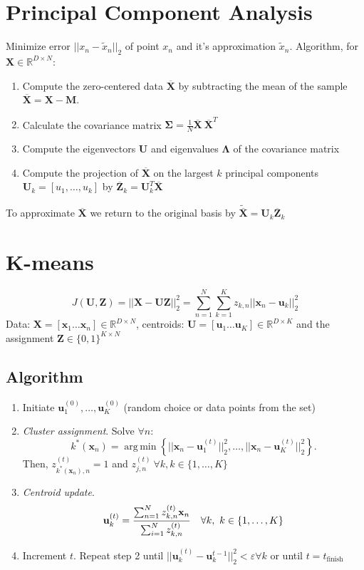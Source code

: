 \documentclass[a4paper,11pt,landscape]{article}
\renewcommand{\epsilon}{\varepsilon}
\newcommand{\argmin}{\operatorname*{arg\,min}}
\newcommand{\R}{\mathbb{R}}
\newcommand{\sectionline}{\noindent\makebox[\linewidth]{\rule{\columnwidth}{0.1pt}}}
\newcommand{\msection}[1]{\vspace{-1mm}\sectionline\vspace{-1mm}\section{#1}\vspace{-1mm}}
\begin{document}
\begin{multicols}{3}
\msection{Principal Component Analysis}
Minimize error $||x_n - \tilde x_n||_2$ of point $x_n$ and it's approximation $\tilde x_n$.
Algorithm, for $\mathbf X\in \R^{D\times N}$:
\begin{enumerate}
 \item Compute the zero-centered data $\overline{\mathbf X}$ by subtracting the mean of the sample $\overline{\mathbf X} = \mathbf X - \mathbf M$.
 \item Calculate the covariance matrix $\mathbf \Sigma = \frac{1}{N}\overline{\mathbf X} \ \overline{\mathbf X}^T$
 \item Compute the eigenvectors $\mathbf U$ and eigenvalues $\mathbf \Lambda$ of the covariance matrix
 \item Compute the projection of $\overline{\mathbf X}$ on the largest $k$ principal components $\mathbf U_k = [u_1, \ldots, u_k]$ by $\overline{\mathbf Z}_k = \mathbf U_k^T \overline{\mathbf X}$
\end{enumerate}
To approximate $\overline{\mathbf X}$ we return to the original basis by $\tilde{\overline{\mathbf X}} = \mathbf U_k \overline{\mathbf Z}_k$

\msection{$\mathbf K$-means}
\[
    J(\mathbf U, \mathbf Z) = ||\mathbf X - \mathbf{UZ}||_2^2 = \sum_{n=1}^N \sum_{k=1}^K z_{k,n} ||\mathbf x_n - \mathbf u_k ||_2^2
\]
Data: $\mathbf X = [\mathbf x_1 \ldots \mathbf x_n] \in \R^{D\times N}$, centroids: $\mathbf U = [\mathbf u_1 \ldots \mathbf u_K] \in \R^{D\times K}$ and the assignment $\mathbf Z \in \{0,1\}^{K \times N}$
\subsection{Algorithm}
\begin{enumerate}
 \item Initiate $\mathbf u_1^{(0)}, \ldots, \mathbf u_K^{(0)}$ (random choice or data points from the set)
 \item \emph{Cluster assignment}. Solve $\forall n$:
 \[
  k^*(\mathbf x_n) = \argmin \left\{||\mathbf x_n - \mathbf u_1^{(t)}||_2^2,\ldots, ||\mathbf x_n - \mathbf u_K^{(t)}||_2^2 \right\}.
 \]
 Then, $z_{k^*(\mathbf x_n), n}^{(t)} = 1$ and $z_{j, n}^{(t)}\ \forall k, k\in \{1, \ldots, K\}$
\item \emph{Centroid update}.
\[
 \mathbf u_k^{(t)} = {\sum_{n=1}^N z_{k,n}^{(t)}\mathbf x_n \over \sum_{i=1}^N z_{k,n}^{(t)}}\quad \forall k,\ k \in \{1, \ldots, K\}
\]
\item Increment $t$. Repeat step 2 until $||\mathbf u_k^{(t)} - \mathbf u_k^{t-1}||_2^2 < \epsilon \forall k$ or until $t=t_\text{finish}$


\end{enumerate}
\end{multicols}
\end{document}
